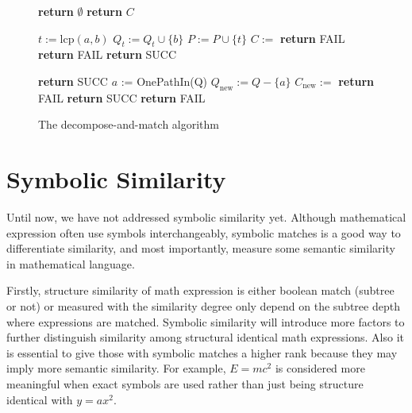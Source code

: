 \begin{figure}
\begin{algorithmic}[1]

\State \textbf{return} $\emptyset$ 
\Else
{} 
\EndIf
\EndFor
\State \textbf{return} $C$
\EndProcedure

\State {}

\State $t := \mathrm{lcp}(a,b)$
\State $Q_t := Q_t \cup \{b\}$
\State $P := P \cup \{t\}$
\EndFor
{}
\State $C := $ 
\State \textbf{return} FAIL
\EndIf
\EndIf
\EndFor
\EndFor
{} 
\State \textbf{return} FAIL
\EndIf
\EndFor
\State \textbf{return} SUCC 
\EndProcedure

\State {}

 \textbf{return} SUCC 
\EndIf
\State $a$ := OnePathIn(Q)
\State $Q_{\mathrm{new}} := Q - \{a\}$
\State $C_{\mathrm{new}} := $ 
 \textbf{return} FAIL 
\EndIf
{}
\textbf{return} SUCC 
\EndIf
\EndFor
\State \textbf{return} FAIL
\EndProcedure

\end{algorithmic}
\caption{The decompose-and-match algorithm}\label{submatchalgo}
\end{figure}

\section{Symbolic Similarity}
Until now, we have not addressed symbolic similarity yet. 
Although mathematical expression often use symbols interchangeably, symbolic matches is a good way to differentiate similarity, and most importantly, measure some semantic similarity in mathematical language.

Firstly, structure similarity of math expression is either boolean match (subtree or not) or measured with the similarity degree only depend on the subtree depth where expressions are matched. Symbolic similarity will introduce more factors to further distinguish similarity among structural identical math expressions.
Also it is essential to give those with symbolic matches a higher rank because they may imply more semantic similarity. 
For example, $E=mc^2$ is considered more meaningful when exact symbols are used rather than just being structure identical with $y=ax^2$.

